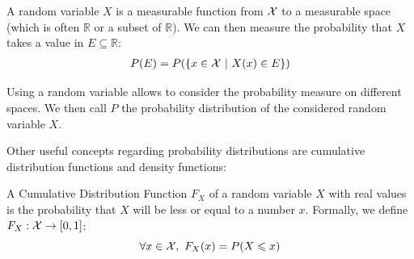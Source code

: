 \begin{definition}
    A random variable $X$ is a measurable function from ${\mathcal{X}}$ to a measurable space (which is often $\mathbb{R}$ or a subset of $\mathbb{R}$). We can then measure the probability that $X$ takes a value in $E\subseteq\mathbb{R}$:
    \begin{align*}
        P(E) = P(\{x\in{\mathcal{X}}~|~X(x)\in E\})
    \end{align*}
\end{definition}

Using a random variable allows to consider the probability measure on different spaces. We then call $P$ the probability distribution of the considered random variable $X$.

Other useful concepts regarding probability distributions are cumulative distribution functions and density functions:
\begin{definition}\label{def:cdf}
    A Cumulative Distribution Function $F_X$ of a random variable $X$ with real values is the probability that $X$ will be less or equal to a number $x$. Formally, we define $F_X:{\mathcal{X}}\rightarrow[0,1]$:
    \begin{equation*}
        \forall x\in{\mathcal{X}},~F_X(x)=P(X\leqslant x)
    \end{equation*}
\end{definition}


